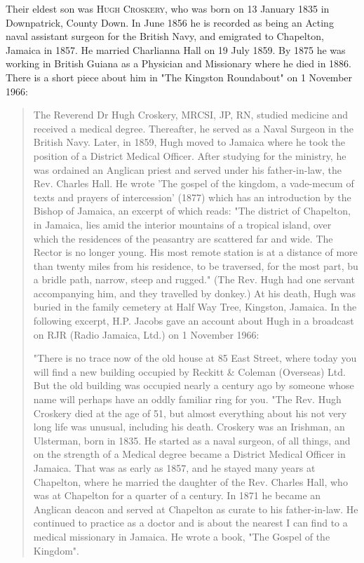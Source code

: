 Their eldest son was \textsc{Hugh Croskery},  who was born on 13 January 1835 in Downpatrick, County Down. In June 1856 he is recorded as being an Acting naval assistant surgeon for the British Navy, and emigrated to Chapelton, Jamaica in 1857.  He married Charlianna Hall on	19 July 1859. By 1875 he was working in	British Guiana as a Physician and Missionary where he died in 1886. There is a short piece about him in "The Kingston Roundabout" on 1 November 1966:
\begin{quotation}
The Reverend Dr Hugh Croskery, MRCSI, JP, RN, studied medicine and received a medical degree. Thereafter, he served as a Naval Surgeon in the British Navy. Later, in 1859, Hugh moved to Jamaica where he took the position of a District Medical Officer. After studying for the ministry, he was ordained an Anglican priest and served under his father-in-law, the Rev. Charles Hall. He wrote 'The gospel of the kingdom, a vade-mecum of texts and prayers of intercession' (1877) which has an introduction by the Bishop of Jamaica, an excerpt of which reads: "The district of Chapelton, in Jamaica, lies amid the interior mountains of a tropical island, over which the residences of the peasantry are scattered far and wide. The Rector is no longer young. His most remote station is at a distance of more than twenty miles from his residence, to be traversed, for the most part, bu a bridle path, narrow, steep and rugged." (The Rev. Hugh had one servant accompanying him, and they travelled by donkey.) At his death, Hugh was buried in the family cemetery at Half Way Tree, Kingston, Jamaica. In the following excerpt, H.P. Jacobs gave an account about Hugh in a broadcast on RJR 
(Radio Jamaica, Ltd.) on 1 November 1966:

    "There is no trace now of the old house at 85 East Street, where today you will  
    find a new building occupied by Reckitt & Coleman (Overseas) Ltd.  But the old building 
    was occupied nearly a century ago by someone whose name will perhaps  
    have an oddly familiar ring for you. 
         "The Rev. Hugh Croskery died at the age of 51, but almost everything about his  
    not very long life was unusual, including his death. Croskery was an Irishman, an  
    Ulsterman, born in 1835.  He started as a naval surgeon, of all things, and on the  
    strength of a Medical degree became a District Medical Officer in Jamaica. That was  
    as early as 1857, and he stayed many years at Chapelton, where he married the  
    daughter of the Rev. Charles Hall, who was at Chapelton for a quarter of a century.   
    In 1871 he became an Anglican deacon and served at Chapelton as curate to his  
    father-in-law.  He continued to practice as a doctor and is about the nearest I can  
    find to a medical missionary in Jamaica. He wrote a book, "The Gospel of the Kingdom".
    \end{quotation}
    
